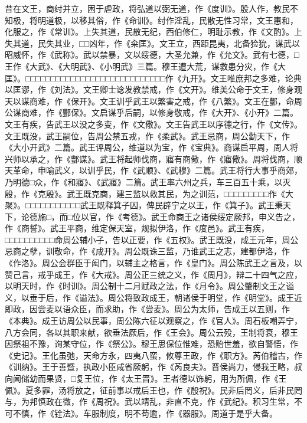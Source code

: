 \documentclass[]{article}
\begin{document}
昔在文王，商纣并立，困于虐政，将弘道以弼无道，作《度训》。殷人作，教民不知极，将明道极，以移其俗，作《命训》。纣作淫乱，民散无性习常，文王惠和，化服之，作《常训》。上失其道，民散无纪，西伯修仁，明耻示教，作《文酌》。上失其道，民失其业，□□凶年，作《籴匡》。文王立，西距昆夷，北备猃狁，谋武以昭威怀，作《武称》。武以禁暴，文以绥德，大圣允兼，作《允文》。武有七德，□王作《大武》、《大明武》、《小明武》三篇。穆王遭大荒，谋救患分灾，作《大匡》。□□□□□□□□□□□□□□□□□□□□□□□□□□□□作《九开》。文王唯庶邦之多难，论典以匡谬，作《刘法》。文王卿士谂发教禁戒，作《文开》。维美公命于文王，修身观天以谋商难，作《保开》。文王训乎武王以繁害之戒，作《八繁》。文王在酆，命周公谋商难，作《酆保》。文启谋乎后嗣，以修身敬戒，作《大开》、《小开》二篇。文王有疾，告武王以没之多变，作《文儆》。文王告武王以序德之行，作《文传》。文王既没，武王嗣位，告周公禁五戎，作《柔武》。武王忌商，周公勤天下，作《大小开武》二篇。武王评周公，维道以为宝，作《宝典》。商谋启平周，周人将兴师以承之，作《酆谋》。武王将起师伐商，寤有商儆，作《寤儆》。周将伐商，顺天革命，申喻武义，以训乎民，作《武顺》、《武穆》二篇。武王将行大事乎商郊，乃明德□众，作《和寤》、《武寤》二篇。武王率六州之兵，车三百五十乘，以灭殷，作《克殷》。武王既克商，建三监以救其民，为之训范，□□□□□□□□□作《大聚》。□□□□□□□□□□□武王既释箕子囚，俾民辟宁之以王，作《箕子》。武王秉天下，论德施□，而□位以官，作《考德》。武王命商王之诸侯绥定厥邦，申义告之，作《商誓》。武王平商，维定保天室，规拟伊洛，作《度邑》。武王有疾，□□□□□□□□□□命周公辅小子，告以正要，作《五权》。武王既没，成王元年，周公忌商之孽，训敬命，作《成开》。周公既诛三监，乃谁武王之志，建都伊洛，作《作洛》。周公会群臣于闳门，以辅主之格言，作《皇门》。周公陈武王之言及，以赞己言，戒乎成王，作《大戒》。周公正三统之义，作《周月》，辩二十四气之应，以明天时，作《时训》。周公制十二月赋政之法，作《月令》。周公肇制文王之谥义，以垂于后，作《谥法》。周公将致政成王，朝诸侯于明堂，作《明堂》。成王近即政，因尝麦以语众臣，而求助，作《尝麦》。周公为太师，告成王以五则，作《本典》。成王访周公以民事，周公陈六征以观察之，作《官人》。周石板嘲弄宁，八方会同，各以其职来献，欲垂法厥后，作《王会》。周公云殁，王制将衰，穆王因祭祖不豫，询某守位，作《祭公》。穆王思保位惟难，恐贻世羞，欲自警悟，作《史记》。王化虽弛，天命方永，四夷八蛮，攸尊王政，作《职方》。芮伯稽古，作《训纳》。王于善暨，执政小臣咸省厥躬，作《芮良夫》。晋侯尚力，侵我王略，叔向闻储幼而果贤，□复王位，作《太王晋》。王者德以饰躬，用为所佩，作《王佩》。夏多罪，汤将放之，征前事以戒后王也，作《殷祝》。民非后罔义，后非民罔与，为邦慎政在微，作《周祝》。武以靖乱，非直不克，作《武纪》。积习生常，不可不慎，作《铨法》。车服制度，明不苟逾，作《器服》。周道于是乎大备。
\end{document}
